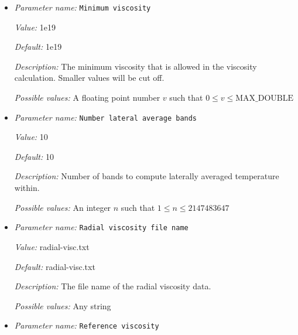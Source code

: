 \begin{itemize}
{\it Value:} 1e23


{\it Default:} 1e23


{\it Description:} The maximum viscosity that is allowed in the viscosity calculation. Larger values will be cut off.


{\it Possible values:} A floating point number $v$ such that $0 \leq v \leq \text{MAX\_DOUBLE}$
\item {\it Parameter name:} {\tt Minimum viscosity}
\label{parameters:Material model/Steinberger model/Minimum viscosity}


{\it Value:} 1e19


{\it Default:} 1e19


{\it Description:} The minimum viscosity that is allowed in the viscosity calculation. Smaller values will be cut off.


{\it Possible values:} A floating point number $v$ such that $0 \leq v \leq \text{MAX\_DOUBLE}$
\item {\it Parameter name:} {\tt Number lateral average bands}
\label{parameters:Material model/Steinberger model/Number lateral average bands}


{\it Value:} 10


{\it Default:} 10


{\it Description:} Number of bands to compute laterally averaged temperature within.


{\it Possible values:} An integer $n$ such that $1\leq n \leq 2147483647$
\item {\it Parameter name:} {\tt Radial viscosity file name}
\label{parameters:Material model/Steinberger model/Radial viscosity file name}


{\it Value:} radial-visc.txt


{\it Default:} radial-visc.txt


{\it Description:} The file name of the radial viscosity data. 


{\it Possible values:} Any string
\item {\it Parameter name:} {\tt Reference viscosity}
\label{parameters:Material model/Steinberger model/Reference viscosity}



\end{itemize}
